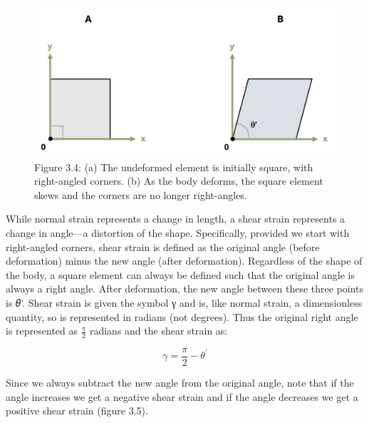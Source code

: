 \documentclass[
  letterpaper,
  DIV=11,
  numbers=noendperiod]{scrreprt}
\begin{document}
\begin{figure}[H]

{\centering \includegraphics{images/CH3 PNGs/figure 3.4.png}

}

\caption{Figure 3.4: (a) The undeformed element is initially square,
with right-angled corners. (b) As the body deforms, the square element
skews and the corners are no longer right-angles.}

\end{figure}%

While normal strain represents a change in length, a shear strain
represents a change in angle---a distortion of the shape. Specifically,
provided we start with right-angled corners, shear strain is defined as
the original angle (before deformation) minus the new angle (after
deformation). Regardless of the shape of the body, a square element can
always be defined such that the original angle is always a right angle.
After deformation, the new angle between these three points is 𝜃'. Shear
strain is given the symbol γ and is, like normal strain, a dimensionless
quantity, so is represented in radians (not degrees). Thus the original
right angle is represented as \(\frac{\pi}{2}\) radians and the shear
strain as:

\[
\gamma=\frac{\pi}{2}-\theta^{\prime}
\]

Since we always subtract the new angle from the original angle, note
that if the angle increases we get a negative shear strain and if the
angle decreases we get a positive shear strain (figure 3.5).
\end{document}
